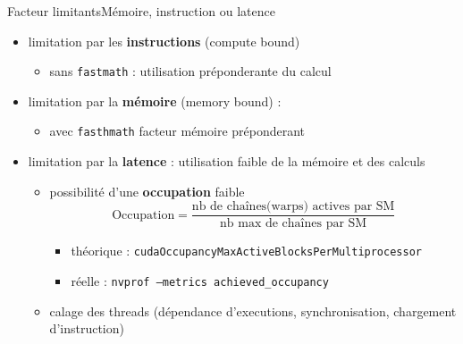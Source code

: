 \documentclass[11pt,mathserif]{beamer}
\begin{document}
\begin{frame}{Facteur limitants}{Mémoire, instruction ou latence}
  \begin{itemize}[<+->]
    \item limitation par les {\bf instructions} (compute bound) 
      \begin{itemize}
        \item sans {\tt fastmath} : utilisation préponderante du calcul
      \end{itemize}
    \item limitation par la {\bf mémoire } (memory bound) : 
      \begin{itemize}
        \item avec {\tt fasthmath} facteur mémoire préponderant
      \end{itemize}
    \item limitation par la {\bf latence} : utilisation faible de la mémoire et des calculs
      \begin{itemize}
        \item possibilité d'une {\bf occupation} faible 
          $$ \mbox{Occupation} = \frac{\mbox{nb de chaînes(warps) actives par SM}}{\mbox{nb max de chaînes par SM}} $$
      \begin{itemize}
        \item théorique : {\tt cudaOccupancyMaxActiveBlocksPerMultiprocessor }
        \item réelle : {\tt nvprof --metrics achieved\_occupancy }
      \end{itemize}
        \item calage des threads (dépendance d'executions, synchronisation, chargement d'instruction)
      \end{itemize}
\end{itemize}
\end{frame}
\end{document}
